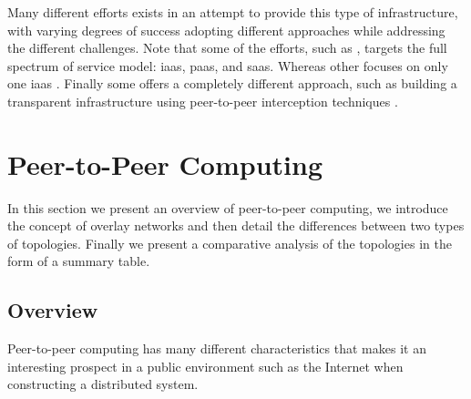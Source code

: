 \documentclass[12pt, titlepage]{uo_temp}
\begin{document}
     Many different efforts exists in an attempt to provide this type of infrastructure,
     with varying degrees of success adopting different approaches while addressing the
     different challenges. Note that some of the efforts, such as \cite{cunsolo2010open},
     targets the full spectrum of service model: \gls{iaas}, \gls{paas}, and
     \gls{saas}. Whereas other focuses on only one \gls{iaas} \cite{P2PCS}
     \cite{chandra2009nebulas}.  Finally some offers a completely different approach, such
     as building a transparent infrastructure using peer-to-peer interception techniques
     \cite{mondejar2013cloudsnap}.
     
     \section{Peer-to-Peer Computing}
     In this section we present an overview of peer-to-peer computing, we 
     introduce the concept of overlay networks and then detail the differences between 
     two types of topologies. Finally we present a comparative analysis of the topologies
     in the form of a summary table.

     \subsection{Overview}
     Peer-to-peer computing has many different characteristics that makes it an
     interesting prospect in a public environment such as the Internet when constructing a
     distributed system.
\end{document}
